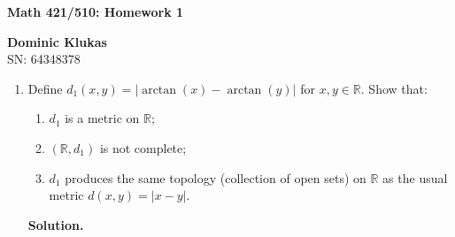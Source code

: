 \documentclass[11pt]{article}
\newcommand{\R}{\mathbb{R}}
\begin{document}
\begin{center}
{\Large \textbf{Math 421/510: Homework 1}}
\end{center}


\begin{center}
\textbf{Dominic Klukas}\\
SN: 64348378
\end{center}

\begin{enumerate}[label=\arabic*., leftmargin=*, itemsep=10pt]

\item Define $d_1(x,y)=\lvert \arctan(x)-\arctan(y)\rvert$ for $x,y\in\R$. Show that:
\begin{enumerate}[label=(\alph*), itemsep=4pt]
\item $d_1$ is a metric on $\R$;
\item $(\R,d_1)$ is not complete;
\item $d_1$ produces the same topology (collection of open sets) on $\R$ as the usual metric
$d(x,y)=\lvert x-y\rvert$.
\end{enumerate}


\textbf{Solution.}


\end{enumerate}
\end{document}
